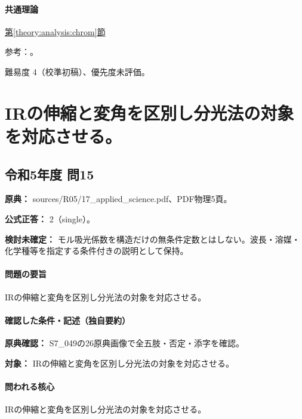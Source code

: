 \paragraph{共通理論} \hyperref[theory:analysis:chrom]{第\ref*{theory:analysis:chrom}節}

\par 参考：\cite{analysis49_chrom_ref,analysis49_library_ref,analysis49_hplc_ref}。

\par 難易度 4（校準初稿）、優先度未評価。

\section{IRの伸縮と変角を区別し分光法の対象を対応させる。}

\subsection{令和5年度 問15}
\label{q:r05-reg-applied-15}

\noindent\textbf{原典：} sources/R05/17\_applied\_science.pdf、PDF物理5頁。

\textbf{公式正答：} 2（single）。

\par\textbf{検討未確定：} モル吸光係数を構造だけの無条件定数とはしない。波長・溶媒・化学種等を指定する条件付きの説明として保持。

\paragraph{問題の要旨} IRの伸縮と変角を区別し分光法の対象を対応させる。

\paragraph{確認した条件・記述（独自要約）}\mbox{}\par

\noindent\textbf{原典確認：} S7\_049の26原典画像で全五肢・否定・添字を確認。\par

\noindent\textbf{対象：} IRの伸縮と変角を区別し分光法の対象を対応させる。\par

\paragraph{問われる核心} IRの伸縮と変角を区別し分光法の対象を対応させる。

